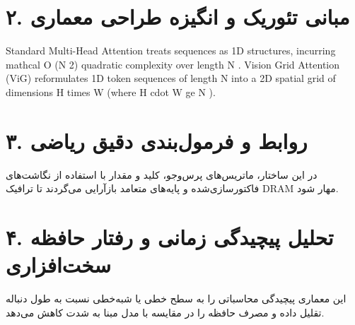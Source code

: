 \documentclass[12pt,a4paper]{article}
\begin{document}
\section*{۲. مبانی تئوریک و انگیزه طراحی معماری}
Standard Multi-Head Attention treats sequences as 1D structures, incurring mathcal O (N 2) quadratic complexity over length N . Vision Grid Attention (ViG) reformulates 1D token sequences of length N into a 2D spatial grid of dimensions H times W (where H cdot W ge N ).

\section*{۳. روابط و فرمول‌بندی دقیق ریاضی}
در این ساختار، ماتریس‌های پرس‌وجو، کلید و مقدار با استفاده از نگاشت‌های فاکتورسازی‌شده و پایه‌های متعامد بازآرایی می‌گردند تا ترافیک DRAM مهار شود.

\section*{۴. تحلیل پیچیدگی زمانی و رفتار حافظه سخت‌افزاری}
این معماری پیچیدگی محاسباتی را به سطح خطی یا شبه‌خطی نسبت به طول دنباله تقلیل داده و مصرف حافظه را در مقایسه با مدل مبنا به شدت کاهش می‌دهد.
\end{document}
